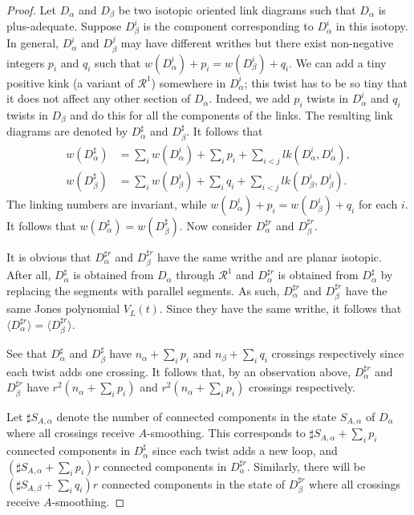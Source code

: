 \begin{proof}
\label{sec:second-tait-conj-4}
Let $D_{\alpha}$ and $D_{\beta}$ be two isotopic oriented link diagrams such that $D_{\alpha}$ is plus-adequate. Suppose $D_{\beta}^i$ is the component corresponding to $D_{\alpha}^i$ in this isotopy. In general, $D_{\alpha}^i$ and $D_{\beta}^j$ may have different writhes but there exist non-negative integers $p_i$ and $q_i$ such that $w(D_{\alpha}^i) + p_i = w(D_{\beta}^i) + q_i$. We can add a tiny positive kink (a variant of $\mathcal{R}^1$) somewhere in $D_{\alpha}^i$; this twist has to be so tiny that it does not affect any other section of $D_{\alpha}$. Indeed, we add $p_i$ twists in $D_{\alpha}^i$ and $q_i$ twists in $D_{\beta}$ and do this for all the components of the links. The resulting link diagrams are denoted by $D_{\alpha}^{\sharp}$ and $D_{\beta}^{\sharp}$. It follows that 
\begin{align*}
  w(D_{\alpha}^{\sharp}) &= \sum_i^{}w(D_{\alpha}^i) + \sum_i^{}p_i + \sum_{i<j}^{}lk(D_{\alpha}^i, D_{\alpha}^i), \\
  w(D_{\beta}^{\sharp}) &= \sum_i^{}w(D_{\beta}^i) + \sum_i^{}q_i + \sum_{i<j}^{}lk(D_{\beta}^i, D_{\beta}^i).
\end{align*}
The linking numbers are invariant, while $w(D_{\alpha}^i) + p_i = w(D_{\beta}^i) + q_i$ for each $i$. It follows that $w(D_{\alpha}^{\sharp}) = w(D_{\beta}^{\sharp})$. Now consider $D_{\alpha}^{\sharp r}$ and $D_{\beta}^{\sharp r}$.

It is obvious that $D_{\alpha}^{\sharp r}$ and $D_{\beta}^{\sharp r}$ have the same writhe and are planar isotopic. After all, $D_{\alpha}^{\sharp}$ is obtained from $D_{\alpha}$ through $\mathcal{R}^1$ and $D_{\alpha}^{\sharp r}$ is obtained from $D_{\alpha}^{\sharp}$ by replacing the segments with parallel segments. As such, $D_{\alpha}^{\sharp r}$ and $D_{\beta}^{\sharp r}$ have the same Jones polynomial $V_L(t)$. Since they have the same writhe, it follows that $\langle D_{\alpha}^{\sharp r} \rangle = \langle D_{\beta}^{\sharp r} \rangle$. 

See that $D_{\alpha}^{\sharp}$ and $D_{\beta}^{\sharp}$ have $n_{\alpha} + \sum_i p_i$ and $n_{\beta} + \sum_i q_i$ crossings respectively since each twist adds one crossing. It follows that, by an observation above, $D_{\alpha}^{\sharp r}$ and $D_{\beta}^{\sharp r}$ have $r^2(n_{\alpha} + \sum_i p_i)$ and $r^2(n_{\alpha} + \sum_i p_i)$ crossings respectively.

Let $\sharp S_{A,\alpha}$ denote the number of connected components in the state $S_{A,\alpha}$ of $D_{\alpha}$ where all crossings receive $A$-smoothing. This corresponds to $\sharp S_{A,\alpha} + \sum_i p_i$ connected components in $D_{\alpha}^{\sharp}$ since each twist adds a new loop, and $(\sharp S_{A,\alpha} + \sum_i^{} p_i)r$ connected components in $D_{\alpha}^{\sharp r}$. Similarly, there will be $(\sharp S_{A,\beta} + \sum_i^{} q_i)r$ connected components in the state of $D_{\beta}^{\sharp r}$ where all crossings receive $A$-smoothing.


\end{proof}
